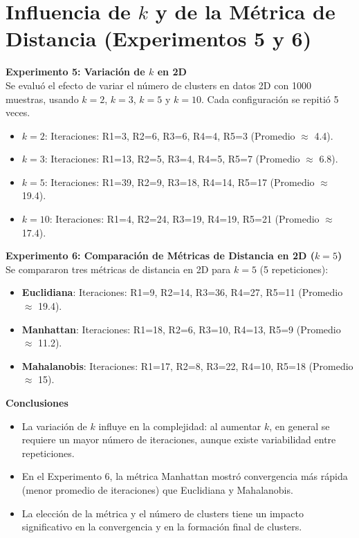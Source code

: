 \documentclass[a4paper, 10pt]{article}
\begin{document}
\newpage

\section*{Influencia de $k$ y de la Métrica de Distancia (Experimentos 5 y 6)}
\textbf{Experimento 5: Variación de $k$ en 2D}\\[2pt]
Se evaluó el efecto de variar el número de clusters en datos 2D con 1000 muestras, usando $k=2$, $k=3$, $k=5$ y $k=10$. Cada configuración se repitió 5 veces.
\begin{itemize}
  \item \textbf{$k=2$}: Iteraciones: R1=3, R2=6, R3=6, R4=4, R5=3 (Promedio $\approx$ 4.4).
  \item \textbf{$k=3$}: Iteraciones: R1=13, R2=5, R3=4, R4=5, R5=7 (Promedio $\approx$ 6.8).
  \item \textbf{$k=5$}: Iteraciones: R1=39, R2=9, R3=18, R4=14, R5=17 (Promedio $\approx$ 19.4).
  \item \textbf{$k=10$}: Iteraciones: R1=4, R2=24, R3=19, R4=19, R5=21 (Promedio $\approx$ 17.4).
\end{itemize}

\vspace{5mm}
\textbf{Experimento 6: Comparación de Métricas de Distancia en 2D ($k=5$)}\\[2pt]
Se compararon tres métricas de distancia en 2D para $k=5$ (5 repeticiones):
\begin{itemize}
  \item \textbf{Euclidiana}: Iteraciones: R1=9, R2=14, R3=36, R4=27, R5=11 (Promedio $\approx$ 19.4).
  \item \textbf{Manhattan}: Iteraciones: R1=18, R2=6, R3=10, R4=13, R5=9 (Promedio $\approx$ 11.2).
  \item \textbf{Mahalanobis}: Iteraciones: R1=17, R2=8, R3=22, R4=10, R5=18 (Promedio $\approx$ 15).
\end{itemize}

\textbf{Conclusiones}
\begin{itemize}
  \item La variación de $k$ influye en la complejidad: al aumentar $k$, en general se requiere un mayor número de iteraciones, aunque existe variabilidad entre repeticiones.
  \item En el Experimento 6, la métrica Manhattan mostró convergencia más rápida (menor promedio de iteraciones) que Euclidiana y Mahalanobis.
  \item La elección de la métrica y el número de clusters tiene un impacto significativo en la convergencia y en la formación final de clusters.
\end{itemize}
\end{document}
